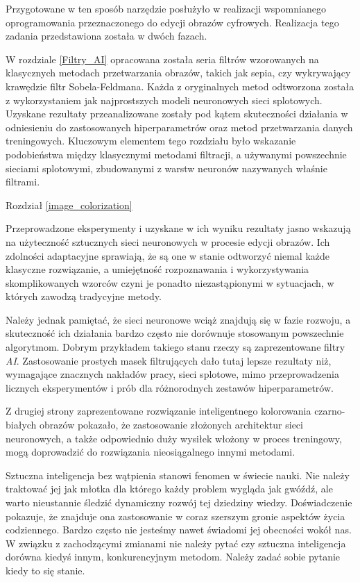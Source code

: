 \documentclass[10pt, a4paper, twoside, notitlepage, openright]{article}
\begin{document}
  Przygotowane w ten sposób narzędzie posłużyło w realizacji wspomnianego oprogramowania
  przeznaczonego do edycji obrazów cyfrowych. Realizacja tego zadania przedstawiona
  została w dwóch fazach.

  W rozdziale \ref{Filtry_AI} opracowana została seria filtrów wzorowanych na
  klasycznych metodach przetwarzania obrazów, takich jak sepia, czy wykrywający
  krawędzie filtr Sobela-Feldmana. Każda z oryginalnych metod odtworzona
  została z wykorzystaniem jak najprostszych modeli neuronowych sieci splotowych.
  Uzyskane rezultaty przeanalizowane zostały pod kątem skuteczności działania
  w odniesieniu do zastosowanych hiperparametrów oraz metod przetwarzania danych
  treningowych. Kluczowym elementem tego rozdziału było wskazanie podobieństwa
  między klasycznymi metodami filtracji, a używanymi powszechnie sieciami
  splotowymi, zbudowanymi z warstw neuronów nazywanych właśnie filtrami.

  Rozdział \ref{image_colorization}

  Przeprowadzone eksperymenty i uzyskane w ich wyniku rezultaty jasno
  wskazują na użyteczność sztucznych sieci neuronowych w procesie edycji obrazów.
  Ich zdolności adaptacyjne sprawiają, że są one w stanie odtworzyć niemal każde
  klasyczne rozwiązanie, a umiejętność rozpoznawania i wykorzystywania
  skomplikowanych wzorców czyni je ponadto niezastąpionymi w sytuacjach, w których
  zawodzą tradycyjne metody.

  Należy jednak pamiętać, że sieci neuronowe wciąż znajdują się w fazie rozwoju,
  a skuteczność ich działania bardzo często nie dorównuje stosowanym powszechnie
  algorytmom. Dobrym przykładem takiego stanu rzeczy są zaprezentowane filtry \textit{AI}.
  Zastosowanie prostych masek filtrujących dało tutaj lepsze rezultaty niż,
  wymagające znacznych nakładów pracy, sieci splotowe, mimo przeprowadzenia licznych
  eksperymentów i prób dla różnorodnych zestawów hiperparametrów.

  Z drugiej strony zaprezentowane rozwiązanie inteligentnego kolorowania
  czarno-białych obrazów pokazało, że zastosowanie złożonych architektur sieci
  neuronowych, a także odpowiednio duży wysiłek włożony w proces treningowy,
  mogą doprowadzić do rozwiązania nieosiągalnego innymi metodami.

  Sztuczna inteligencja bez wątpienia stanowi fenomen w świecie nauki. Nie należy
  traktować jej jak młotka dla którego każdy problem wygląda jak gwóźdź, ale warto
  nieustannie śledzić dynamiczny rozwój tej dziedziny wiedzy. Doświadczenie pokazuje,
  że znajduje ona zastosowanie w coraz szerszym gronie aspektów życia codziennego.
  Bardzo często nie jesteśmy nawet świadomi jej obecności wokół nas. W związku z
  zachodzącymi zmianami nie należy pytać czy sztuczna inteligencja dorówna kiedyś
  innym, konkurencyjnym metodom. Należy zadać sobie pytanie kiedy to się stanie.




\end{document}
